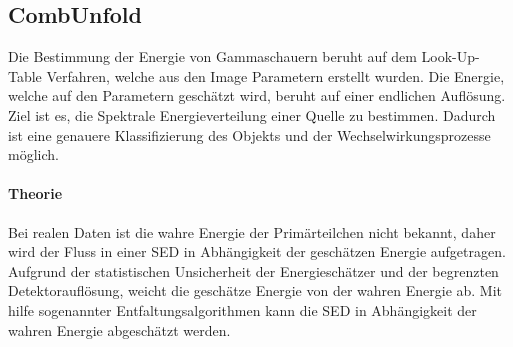 \subsection{CombUnfold}%
\label{sub:combunfold}
Die Bestimmung der Energie von Gammaschauern beruht auf dem Look-Up-Table
Verfahren,
welche aus den Image Parametern erstellt wurden.
Die Energie, welche auf den Parametern geschätzt wird, beruht auf einer
endlichen Auflösung.
Ziel ist es, die Spektrale Energieverteilung einer Quelle zu bestimmen.
Dadurch ist eine genauere Klassifizierung des Objekts und der
Wechselwirkungsprozesse möglich.

\paragraph{Theorie}%


Bei realen Daten ist die wahre Energie der Primärteilchen nicht bekannt,
daher wird der Fluss in einer SED in Abhängigkeit der geschätzen Energie aufgetragen. 
Aufgrund der statistischen Unsicherheit der Energieschätzer 
und der begrenzten Detektorauflösung, 
weicht die geschätze Energie von der wahren Energie ab. 
Mit hilfe sogenannter Entfaltungsalgorithmen kann die SED in Abhängigkeit der wahren Energie abgeschätzt werden.




